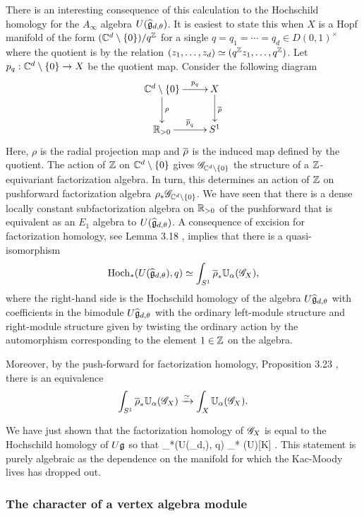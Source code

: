 There is an interesting consequence of this calculation to the Hochschild homology for the $A_\infty$ algebra $U(\Hat{\fg}_{d,\theta})$.
It is easiest to state this when $X$ is a Hopf manifold of the form $(\CC^d \setminus \{0\}) / q^\ZZ$ for a single $q =q_1=\cdots=q_d \in D(0,1)^\times$ where the quotient is by the relation $(z_1,\ldots,z_d) \simeq (q^\ZZ z_1,\ldots,q^\ZZ)$.
Let $p_q :  \CC^d \setminus \{0\} \to X$ be the quotient map.
Consider the following diagram
\[
\xymatrix{
\CC^d \setminus \{0\} \ar[r]^-{p_q} \ar[d]^-{\rho} & X \ar[d]^{\Bar{\rho}} \\
\RR_{>0} \ar[r]^-{\Bar{p}_q} & S^1
}
\]
Here, $\rho$ is the radial projection map and $\Bar{\rho}$ is the induced map defined by the quotient.
The action of $\ZZ$ on $\CC^d \setminus\{0\}$ gives $\sG_{\CC^d \setminus \{0\}}$ the structure of a $\ZZ$-equivariant factorization algebra. 
In turn, this determines an action of $\ZZ$ on pushforward factorization algebra $\rho_* \sG_{\CC^d \setminus \{0\}}$.
We have seen that there is a dense locally constant subfactorization algebra on $\RR_{>0}$ of the pushforward that is equivalent as an $E_1$ algebra to $U(\Hat{\fg}_{d,\theta})$.
A consequence of excision for factorization homology, see Lemma 3.18 \cite{AFTopMan}, implies that there is a quasi-isomorphism
\[
\Hoch_*(U(\Hat{\fg}_{d,\theta}), q) \simeq \int_{S^1} \Bar{\rho}_* \UU_\alpha(\sG_X),
\]
where the right-hand side is the Hochschild homology of the algebra $U \Hat{\fg}_{d,\theta}$ with coefficients in the bimodule $U \Hat{\fg}_{d, \theta}$ with the ordinary left-module structure and right-module structure given by twisting the ordinary action by the automorphism corresponding to the element $1 \in \ZZ$ on the algebra.

Moreover, by the push-forward for factorization homology, Proposition 3.23 \cite{AFTopMan}, there is an equivalence
\[
\int_{S^1} \Bar{\rho}_* \UU_\alpha(\sG_X) \xto{\simeq} \int_X \UU_{\alpha} (\sG_X) .
\]

We have just shown that the factorization homology of $\sG_X$ is equal to the Hochschild homology of $U\fg$ so that
\beqn\label{hoch1}
\Hoch_*(U(\Hat{\fg}_{d,\theta}), q) \simeq \Hoch_* (U\fg)[K] .
\eeqn
This statement is purely algebraic as the dependence on the manifold for which the Kac-Moody lives has dropped out.

\subsubsection{The character of a vertex algebra module}

